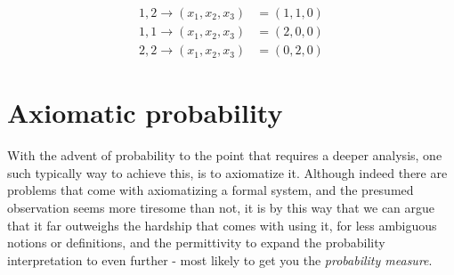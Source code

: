 \begin{equation*}
    \begin{split}
        1,2 \to (x_{1},x_{2},x_{3}) & = (1,1,0)\\
        1,1 \to (x_{1},x_{2},x_{3}) & = (2,0,0)\\
        2,2 \to (x_{1},x_{2},x_{3}) & = (0,2,0)
        \end{split}
\end{equation*}


\section{Axiomatic probability}
With the advent of probability to the point that requires a deeper analysis, one such typically way to achieve this, is to axiomatize it. Although indeed there are problems that come with axiomatizing a formal system, and the presumed observation seems more tiresome than not, it is by this way that we can argue that it far outweighs the hardship that comes with using it, for less ambiguous notions or definitions, and the permittivity to expand the probability interpretation to even further - most likely to get you the \textit{probability measure}. 
